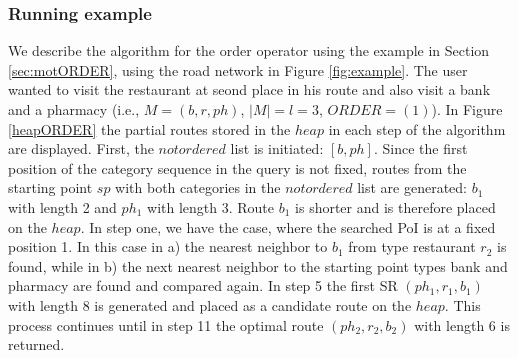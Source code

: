 \subsubsection{Running example}
We describe the algorithm for the order operator using the example in Section \ref{sec:motORDER}, using the road network in Figure \ref{fig:example}. The user wanted to visit the restaurant at seond place in his route and also visit a bank and a pharmacy (i.e., $M = (b, r, ph)$, $|M| = l = 3$, $ORDER = (1)$). In Figure \ref{heapORDER} the partial routes stored in the $heap$ in each step of the algorithm are displayed.
First, the $notordered$ list is initiated: $[b, ph]$. Since the first position of the category sequence in the query is not fixed, routes from the starting point $sp$ with both categories in the $notordered$ list are generated: $b_1$ with length 2 and $ph_1$ with length 3. Route $b_1$ is shorter and is therefore placed on the $heap$. In step one, we have the case, where the searched PoI is at a fixed position 1. In this case in a) the nearest neighbor to $b_1$ from type restaurant $r_2$ is found, while in b) the next nearest neighbor to the starting point types bank and pharmacy are found and compared again. In step 5 the first SR $(ph_1, r_1, b_1)$ with length 8 is generated and placed as a candidate route on the $heap$.
This process continues until in step 11 the optimal route $(ph_2, r_2, b_2)$ with length 6 is returned.

